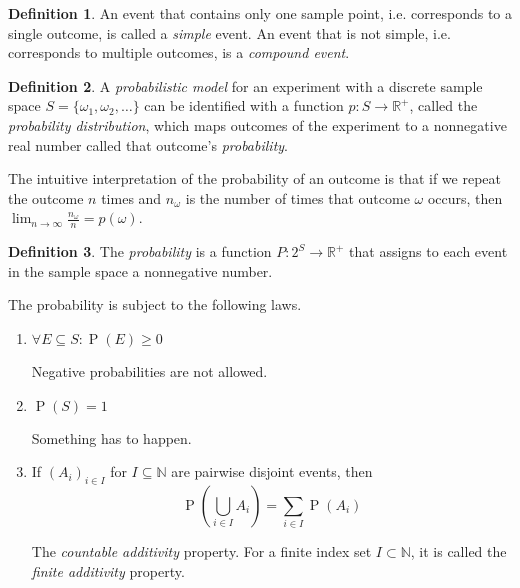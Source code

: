 \documentclass[11pt]{article}
\theoremstyle{definition}
\newtheorem{defn}{Definition}[section]
\theoremstyle{remark}
\newcommand{\parens}[1]{\left(#1\right)}
\newcommand{\Union}{\bigcup}
\newcommand{\R}{\mathbb{R}}
\newcommand{\N}{\mathbb{N}}
\DeclareMathOperator{\Prob}{P}
\renewcommand{\P}[1]{\Prob{\parens{#1}}}
\begin{document}
\begin{defn}
    An event that contains only one sample point, i.e. corresponds to a single
    outcome, is called a \emph{simple} event. An event that is not simple, i.e.
    corresponds to multiple outcomes, is a \emph{compound event}.
\end{defn}

\begin{defn}
    A \emph{probabilistic model} for an experiment with a discrete sample space
    $S = \{\omega_1, \omega_2, \ldots\}$
    can be identified with a function $p : S \to \R^+$, called the
    \emph{probability distribution}, which maps outcomes of the experiment to a
    nonnegative real number called that outcome's \emph{probability}.
\end{defn}

The intuitive interpretation of the probability of an outcome is that if we
repeat the outcome $n$ times and $n_\omega$ is the number of times that outcome
$\omega$ occurs, then $\lim_{n\to\infty} \frac{n_\omega}{n} = p(\omega)$.

\begin{defn}
    The \emph{probability} is a function $P : 2^S \to \R^+$ that assigns to
    each event in the sample space a nonnegative number.

    The probability is subject to the following laws.

    \begin{enumerate}
        \item $\forall E \subseteq S : \P{E} \geq 0$

            Negative probabilities are not allowed.

        \item $\P{S} = 1$

            Something has to happen.

        \item If $(A_i)_{i\in I}$ for $I \subseteq \N$ are pairwise disjoint
            events, then
            \begin{equation}
                \P{\Union_{i \in I} A_i} = \sum_{i \in I} \P{A_i}
                \label{eq:countable-additivity}
            \end{equation}

            The \emph{countable additivity} property. For a finite index set
            $I \subset \N$, it is called the \emph{finite additivity} property.
    \end{enumerate}
\end{defn}
\end{document}
